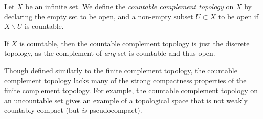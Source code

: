 \documentclass[12pt]{article}
\newcommand{\<}{\langle}
\renewcommand{\>}{\rangle}
\begin{document}
Let $X$ be an infinite set.  We define the \emph{countable complement topology} on $X$ by declaring the empty set to be open, and a non-empty subset $U\subset X$ to be open if $X\backslash U$ is countable.

If $X$ is countable, then the countable complement topology is just the discrete topology, as the complement of \emph{any} set is countable and thus open.

Though defined similarly to the finite complement topology, the countable complement topology lacks many of the strong compactness properties of the finite complement topology.  For example, the countable complement topology on an uncountable set gives an example of a topological space that is not weakly countably compact (but \emph{is} pseudocompact).
\end{document}
